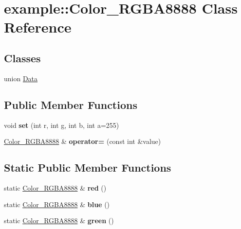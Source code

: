 \hypertarget{classexample_1_1_color___r_g_b_a8888}{}\section{example\+::Color\+\_\+\+R\+G\+B\+A8888 Class Reference}
\label{classexample_1_1_color___r_g_b_a8888}
\subsection*{Classes}
\begin{DoxyCompactItemize}
\item 
union \mbox{\hyperlink{unionexample_1_1_color___r_g_b_a8888_1_1_data}{Data}}
\end{DoxyCompactItemize}
\subsection*{Public Member Functions}
\begin{DoxyCompactItemize}
\item 
\mbox{\label{classexample_1_1_color___r_g_b_a8888_acb398fd03913cc7e30005abf4656ba70}} 
void {\bfseries set} (int r, int g, int b, int a=255)
\item 
\mbox{\label{classexample_1_1_color___r_g_b_a8888_a4143b84e7c9827de3e65e36b2f766686}} 
\mbox{\hyperlink{classexample_1_1_color___r_g_b_a8888}{Color\+\_\+\+R\+G\+B\+A8888}} \& {\bfseries operator=} (const int \&value)
\end{DoxyCompactItemize}
\subsection*{Static Public Member Functions}
\begin{DoxyCompactItemize}
\item 
\mbox{\label{classexample_1_1_color___r_g_b_a8888_af5e11e63dded22f6b0c47e8861dd45d0}} 
static \mbox{\hyperlink{classexample_1_1_color___r_g_b_a8888}{Color\+\_\+\+R\+G\+B\+A8888}} \& {\bfseries red} ()
\item 
\mbox{\label{classexample_1_1_color___r_g_b_a8888_ada828f0c3eee54ac5e2c6b23a6ce901c}} 
static \mbox{\hyperlink{classexample_1_1_color___r_g_b_a8888}{Color\+\_\+\+R\+G\+B\+A8888}} \& {\bfseries blue} ()
\item 
\mbox{\label{classexample_1_1_color___r_g_b_a8888_af0d4320cb0909cd80a2d291c2b19a718}} 
static \mbox{\hyperlink{classexample_1_1_color___r_g_b_a8888}{Color\+\_\+\+R\+G\+B\+A8888}} \& {\bfseries green} ()
\end{DoxyCompactItemize}
